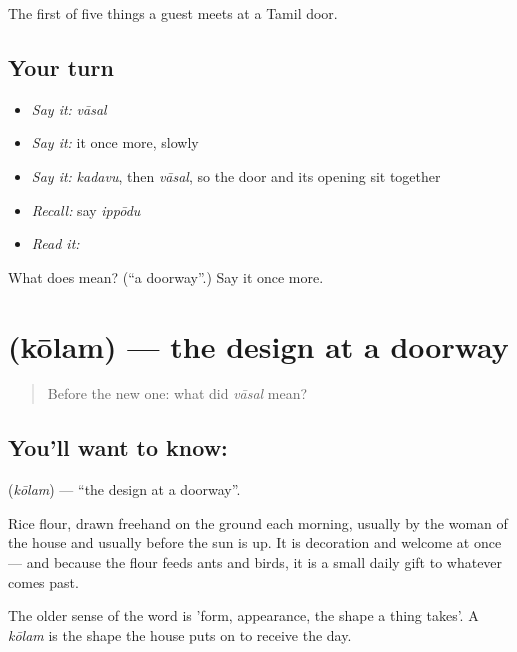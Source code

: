 \begin{grammarlens}[title={What you've built}]
The first of five things a guest meets at a Tamil door.
\end{grammarlens}

\subsection*{Your turn}
\begin{itemize}
\raggedright
  \item \emph{Say it:} \emph{vāsal}
  \item \emph{Say it:} it once more, slowly
  \item \emph{Say it:} \emph{kadavu}, then \emph{vāsal}, so the door and its opening sit together
  \item \emph{Recall:} say \emph{ippōdu}
  \item \emph{Read it:} \textbf{}
\end{itemize}

\begin{tcolorbox}[breakable,colback=teal!4,colframe=teal!35!black,title={Before you move on}]
What does  mean? (\textquotedblleft{}a doorway\textquotedblright{}.) Say it once more.
\end{tcolorbox}
\section[\texorpdfstring{\ta{கோலம்} (kōlam)}{கோலம் (kōlam)}]{ (kōlam) — the design at a doorway}

\label{lesson:TA-C50-kolam}



\begin{quote}
Before the new one: what did \emph{vāsal} mean?
\end{quote}

\subsection*{You'll want to know: }
\textbf{} (\emph{kōlam}) — \textquotedblleft{}the design at a doorway\textquotedblright{}.

Rice flour, drawn freehand on the ground each morning, usually by the woman of the house and usually before the sun is up. It is decoration and welcome at once — and because the flour feeds ants and birds, it is a small daily gift to whatever comes past.

The older sense of the word is 'form, appearance, the shape a thing takes'. A \emph{kōlam} is the shape the house puts on to receive the day.

